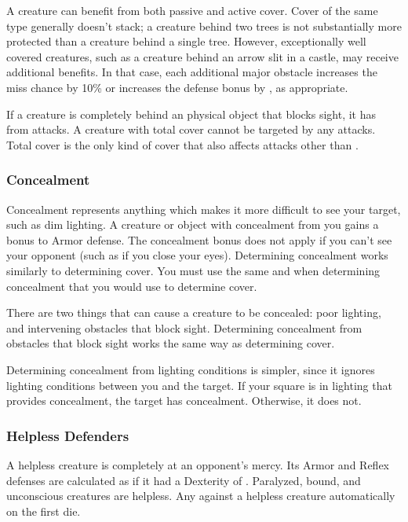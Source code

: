             A creature can benefit from both passive and active cover.
            Cover of the same type generally doesn't stack; a creature behind two trees is not substantially more protected than a creature behind a single tree.
            However, exceptionally well covered creatures, such as a creature behind an arrow slit in a castle, may receive additional benefits.
            In that case, each additional major obstacle increases the miss chance by 10\% or increases the defense bonus by , as appropriate.

            \label{Total Cover}
            If a creature is completely behind an physical object that blocks sight, it has  from attacks.
            A creature with total cover cannot be targeted by any attacks.
            Total cover is the only kind of cover that also affects attacks other than .

        \subsubsection{Concealment}\label{Concealment}
            Concealment represents anything which makes it more difficult to see your target, such as dim lighting.
            A creature or object with concealment from you gains a  bonus to Armor defense.
            The concealment bonus does not apply if you can't see your opponent (such as if you close your eyes).
            Determining concealment works similarly to determining cover.
            You must use the same  and  when determining concealment that you would use to determine cover.

             There are two things that can cause a creature to be concealed: poor lighting, and intervening obstacles that block sight.
            Determining concealment from obstacles that block sight works the same way as determining cover.

            Determining concealment from lighting conditions is simpler, since it ignores lighting conditions between you and the target.
            If your  square is in lighting that provides concealment, the target has concealment.
            Otherwise, it does not.

        \subsubsection{Helpless Defenders}
            A helpless creature is completely at an opponent's mercy.
            Its Armor and Reflex defenses are calculated as if it had a Dexterity of .
            Paralyzed, bound, and unconscious creatures are helpless.
            Any  against a helpless creature automatically  on the first die.

